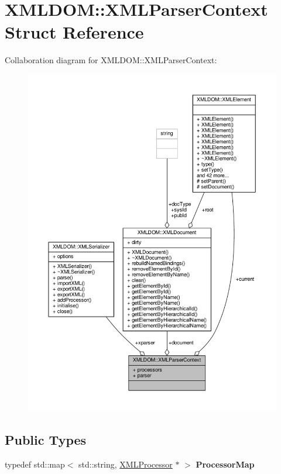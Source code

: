 \hypertarget{structXMLDOM_1_1XMLParserContext}{}\section{X\+M\+L\+D\+OM\+:\+:X\+M\+L\+Parser\+Context Struct Reference}
\label{structXMLDOM_1_1XMLParserContext}


Collaboration diagram for X\+M\+L\+D\+OM\+:\+:X\+M\+L\+Parser\+Context\+:
\nopagebreak
\begin{figure}[H]
\begin{center}
\leavevmode
\includegraphics[width=350pt]{d4/df5/structXMLDOM_1_1XMLParserContext__coll__graph}
\end{center}
\end{figure}
\subsection*{Public Types}
\begin{DoxyCompactItemize}
\item 
typedef std\+::map$<$ std\+::string, \hyperlink{classXMLDOM_1_1XMLProcessor}{X\+M\+L\+Processor} $\ast$ $>$ {\bfseries Processor\+Map}\hypertarget{structXMLDOM_1_1XMLParserContext_a7cffc46fa597c2377f12a7352663063d}{}\label{structXMLDOM_1_1XMLParserContext_a7cffc46fa597c2377f12a7352663063d}

\end{DoxyCompactItemize}
